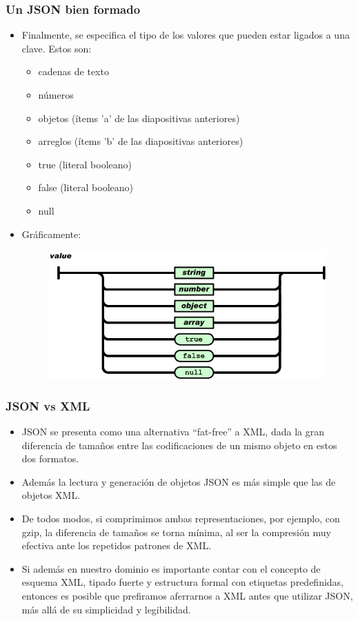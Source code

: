 \begin{frame}
\frametitle{Un JSON bien formado}
\begin{itemize}
\item	Finalmente, se especifica el tipo de los valores que pueden estar ligados a una clave. Estos son:
\begin{itemize}
	\item	cadenas de texto
	\item	números
	\item	objetos (ítems 'a' de las diapositivas anteriores)
	\item	arreglos (ítems 'b' de las diapositivas anteriores)
	\item	true (literal booleano)
	\item	false (literal booleano)
	\item	null
\end{itemize}
\pause
\item Gráficamente: \\
		\begin{figure}
		\includegraphics[scale=0.4]{JSONValue}
		\end{figure}
\end{itemize}
\end{frame}

\begin{frame}
\frametitle{JSON vs XML}
\begin{itemize}
\item	JSON se presenta como una alternativa ``fat-free'' a XML, dada la gran diferencia de tamaños entre las codificaciones de un mismo objeto en estos dos formatos. \\
		\pause
\item	Además la lectura y generación de objetos JSON es más simple que las de objetos XML. \\
		\pause
\item	De todos modos, si comprimimos ambas representaciones, por ejemplo, con gzip, la diferencia de tamaños se torna mínima, al ser la compresión muy efectiva ante los repetidos patrones de XML. \\
		\pause
\item	Si además en nuestro dominio es importante contar con el concepto de esquema XML, tipado fuerte y estructura formal con etiquetas predefinidas, entonces es posible que prefiramos aferrarnos a XML antes que utilizar JSON, más allá de su simplicidad y legibilidad.

\end{itemize}
\end{frame}
